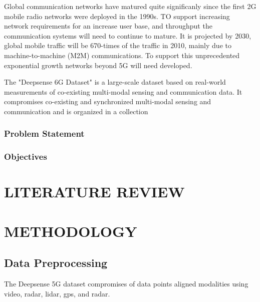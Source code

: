 \documentclass{UCF_ETD}
\begin{document}
Global communication networks have matured quite significanly since the first 2G mobile radio networks were deployed in the 1990s. TO support increasing network requirements for an increase user base, and throughput the communication systems will need to continue to mature. It is projected by 2030, global mobile traffic will be 670-times of the traffic in 2010, mainly due to machine-to-machine (M2M) communications. \cite{salameh20225g}\cite{ITU2370} To support this unprecedented exponential growth networks beyond 5G will need developed.


The "Deepsense 6G Dataset" is a large-scale dataset based on real-world measurements of co-existing multi-modal sensing and communication data. It compromises co-existing and synchronized multi-modal sensing and communication and is organized in a collection 
\cite{alkhateeb2023deepsense}


\subsection{Problem Statement}

\subsection{Objectives}


\chapter{LITERATURE REVIEW}




\chapter{METHODOLOGY}
\section{Data Preprocessing}
The Deepsense 5G dataset compromises of data points aligned modalities using video, radar, lidar, gps, and radar.
\end{document}
